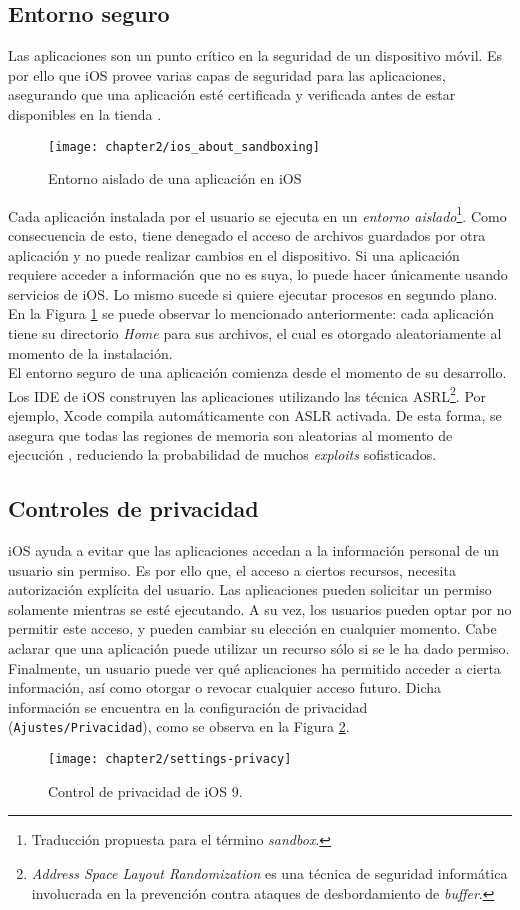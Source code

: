 \subsection{Entorno seguro}
Las aplicaciones son un punto crítico en la seguridad de un dispositivo móvil. Es por ello que iOS provee varias capas de seguridad para las aplicaciones, asegurando que una aplicación esté certificada y verificada antes de estar disponibles en la tienda \cite{asg}.\\
\begin{figure}[hbtp]
	\centering
	\texttt{[image: chapter2/ios\_about\_sandboxing]}
    \caption{Entorno aislado de una aplicación en iOS \cite{iosdl}} 
    \label{fig:ch02:sandboxing}
\end{figure}
Cada aplicación instalada por el usuario se ejecuta en un \emph{entorno aislado}\footnote{Traducción propuesta para el término \textit{sandbox}.}. Como consecuencia de esto, tiene denegado el acceso de archivos guardados por otra aplicación y no puede realizar cambios en el dispositivo. Si una aplicación requiere acceder a información que no es suya, lo puede hacer únicamente usando servicios de iOS. Lo mismo sucede si quiere ejecutar procesos en segundo plano. En la Figura \ref{fig:ch02:sandboxing} se puede observar lo mencionado anteriormente: cada aplicación tiene su directorio \textit{Home} para sus archivos, el cual es otorgado aleatoriamente al momento de la instalación.\\
El entorno seguro de una aplicación comienza desde el momento de su desarrollo. Los IDE de iOS construyen las aplicaciones utilizando las técnica ASRL\footnote{\textit{Address Space Layout Randomization} es una técnica de seguridad informática involucrada en la prevención contra ataques de desbordamiento de \textit{buffer}.}. Por ejemplo, Xcode compila automáticamente con ASLR activada. De esta forma, se asegura que todas las regiones de memoria son aleatorias al momento de ejecución \cite{asg}, reduciendo la probabilidad de muchos \textit{exploits} sofisticados.
\subsection{Controles de privacidad}
iOS ayuda a evitar que las aplicaciones accedan a la información personal de un usuario sin permiso. Es por ello que, el acceso a ciertos recursos, necesita autorización explícita del usuario. Las aplicaciones pueden solicitar un permiso solamente mientras se esté ejecutando. A su vez, los usuarios pueden optar por no permitir este acceso, y pueden cambiar su elección en cualquier momento. Cabe aclarar que una aplicación puede utilizar un recurso sólo si se le ha dado permiso.\\
Finalmente, un usuario puede ver qué aplicaciones ha permitido acceder a cierta información, así como otorgar o revocar cualquier acceso futuro. Dicha información se encuentra en la configuración de privacidad (\texttt{Ajustes/Privacidad}), como se observa en la Figura \ref{fig:ch02:permissions-capture}.
\begin{figure}[hbtp]
    \centering
    \texttt{[image: chapter2/settings-privacy]}
    \caption{Control de privacidad de iOS 9.}
	\label{fig:ch02:permissions-capture}
\end{figure}